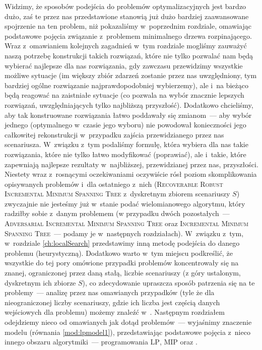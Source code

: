 Widzimy, że sposobów podejścia do problemów optymalizacyjnych jest bardzo dużo, zaś te przez nas przedstawione stanowią już dużo bardziej zaawansowane spojrzenie na ten problem, niż pokazaliśmy w~poprzednim rozdziale, omawiając podstawowe pojęcia związanie z~problemem minimalnego drzewa rozpinającego.
Wraz z~omawianiem kolejnych zagadnień w~tym rozdziale mogliśmy zauważyć naszą potrzebę konstrukcji takich rozwiązań, które nie tylko pozwalać nam będą wybierać najlepsze dla nas rozwiązania, gdy zawczasu przewidzimy wszystkie możliwe sytuacje (im większy zbiór zdarzeń zostanie przez nas uwzględniony, tym bardziej ogólne rozwiązanie najprawdopodobniej wybierzemy), ale i~na bieżąco będą reagować na zaistniałe sytuacje (co pozwala na wybór znacznie lepszych rozwiązań, uwzględniających tylko najbliższą przyszłość).
Dodatkowo chcieliśmy, aby tak konstruowane rozwiązania łatwo poddawały się zmianom~--- aby wybór jednego (optymalnego w~czasie jego wyboru) nie powodował konieczności jego całkowitej rekonstrukcji w~przypadku zajścia przewidzianego przez nas scenariusza.
W~związku z~tym podaliśmy formułę, która wybiera dla nas takie rozwiązania, które nie tylko łatwo modyfikować (poprawiać), ale i~takie, które zapewniają najlepsze rezultaty w~najbliższej, przewidzianej przez nas, przyszłości.
Niestety wraz z~rosnącymi oczekiwaniami oczywiście rósł poziom skomplikowania opisywanych problemów i~dla ostatniego z~nich (\textsc{Recoverable Robust Incremental Minimum Spanning Tree} z~dyskretnym zbiorem scenariuszy $S$) zwyczajnie nie jesteśmy już w~stanie podać wielomianowego algorytmu, który radziłby sobie z~danym problemem (w przypadku dwóch pozostałych~--- \textsc{Adversarial Incremental Minimum Spanning Tree} oraz \textsc{Incremental Minimum Spanning Tree}~--- podamy je w~następnych rozdziałach).
W~związku z~tym, w~rozdziale \ref{ch:localSearch} przedstawimy inną metodę podejścia do danego problemu (heurystyczną).
Dodatkowo warto w~tym miejscu podkreślić, że wszystkie do tej pory omówione przypadki problemów koncentrowały się na znanej, ograniczonej przez daną stałą, liczbie scenariuszy (z góry ustalonym, dyskretnym ich zbiorze $S$), co zdecydowanie upraszcza sposób patrzenia się na te problemy~--- analizę przez nas omawianych przypadków (tyle że dla nieograniczonej liczby scenariuszy, gdzie ich liczba jest częścią danych wejściowych dla problemu) możemy znaleźć w~\cite{DBLP:journals/ipl/KasperskiZ09}.
Następnym rozdziałem odejdziemy nieco od omawianych jak dotąd problemów~--- wyjaśnimy znaczenie modelu (równania \ref{mod:lpmodel1}), przedstawiając podstawowe pojęcia z~nieco innego obszaru algorytmiki~--- programowania \textsc{LP}, \textsc{MIP} oraz .